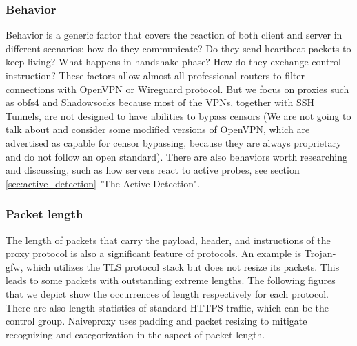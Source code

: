 \documentclass[conference]{IEEEtran}
\begin{document}
\subsubsection{Behavior}
Behavior is a generic factor that covers the reaction of both client and server in different scenarios: how do they communicate? Do they send heartbeat packets to keep living? What happens in handshake phase? How do they exchange control instruction? These factors allow almost all professional routers to filter connections with OpenVPN or Wireguard protocol. But we focus on proxies such as obfs4 and Shadowsocks because most of the VPNs, together with SSH Tunnels, are not designed to have abilities to bypass censors (We are not going to talk about and consider some modified versions of OpenVPN, which are advertised as capable for censor bypassing, because they are always proprietary and do not follow an open standard). There are also behaviors worth researching and discussing, such as how servers react to active probes, see section \ref{sec:active_detection} "The Active Detection".

\subsubsection{Packet length}
The length of packets that carry the payload, header, and instructions of the proxy protocol is also a significant feature of protocols. An example is Trojan-gfw, which utilizes the TLS protocol stack but does not resize its packets. This leads to some packets with outstanding extreme lengths.
The following figures that we depict show the occurrences of length respectively for each protocol.
There are also length statistics of standard HTTPS traffic, which can be the control group. Naiveproxy uses padding and packet resizing to mitigate recognizing and categorization in the aspect of packet length.


\end{document}
